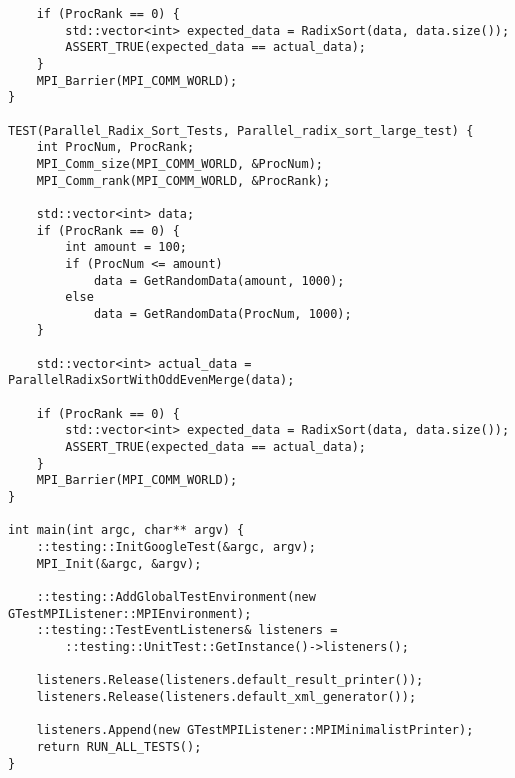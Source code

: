 \documentclass[12pt]{report}
\begin{document}
\begin{lstlisting}
    if (ProcRank == 0) {
        std::vector<int> expected_data = RadixSort(data, data.size());
        ASSERT_TRUE(expected_data == actual_data);
    }
    MPI_Barrier(MPI_COMM_WORLD);
}

TEST(Parallel_Radix_Sort_Tests, Parallel_radix_sort_large_test) {
    int ProcNum, ProcRank;
    MPI_Comm_size(MPI_COMM_WORLD, &ProcNum);
    MPI_Comm_rank(MPI_COMM_WORLD, &ProcRank);

    std::vector<int> data;
    if (ProcRank == 0) {
        int amount = 100;
        if (ProcNum <= amount)
            data = GetRandomData(amount, 1000);
        else
            data = GetRandomData(ProcNum, 1000);
    }

    std::vector<int> actual_data = ParallelRadixSortWithOddEvenMerge(data);

    if (ProcRank == 0) {
        std::vector<int> expected_data = RadixSort(data, data.size());
        ASSERT_TRUE(expected_data == actual_data);
    }
    MPI_Barrier(MPI_COMM_WORLD);
}

int main(int argc, char** argv) {
    ::testing::InitGoogleTest(&argc, argv);
    MPI_Init(&argc, &argv);

    ::testing::AddGlobalTestEnvironment(new GTestMPIListener::MPIEnvironment);
    ::testing::TestEventListeners& listeners =
        ::testing::UnitTest::GetInstance()->listeners();

    listeners.Release(listeners.default_result_printer());
    listeners.Release(listeners.default_xml_generator());

    listeners.Append(new GTestMPIListener::MPIMinimalistPrinter);
    return RUN_ALL_TESTS();
}
\end{lstlisting}
\end{document}
